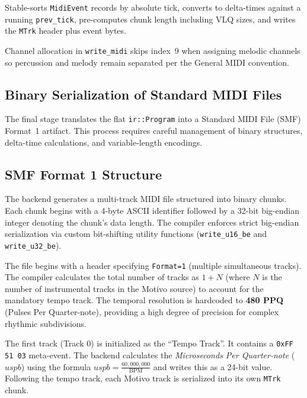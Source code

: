  Stable-sorts \texttt{MidiEvent} records by absolute tick, converts to
delta-times against a running \texttt{prev\_tick}, pre-computes chunk length including VLQ sizes, and writes the
\texttt{MTrk} header plus event bytes.

Channel allocation in \texttt{write\_midi} skips index~9 when assigning melodic channels so percussion and melody remain
separated per the General MIDI convention.

\subsection{Binary Serialization of Standard MIDI Files}\label{subsec:midi-binary-serialization}

The final stage translates the flat \texttt{ir::Program} into a Standard MIDI File (SMF) Format~1 artifact.
This process requires careful management of binary structures, delta-time calculations, and variable-length encodings.

\subsection{SMF Format 1 Structure}\label{detail-subsec:smf-format-1-structure}

The backend generates a multi-track MIDI file structured into binary chunks.
Each chunk begins with a 4-byte ASCII identifier followed by a 32-bit big-endian integer denoting the chunk's data
length.
The compiler enforces strict big-endian serialization via custom bit-shifting utility functions (\texttt{write\_u16\_be}
and \texttt{write\_u32\_be}).

 The file begins with a header specifying \texttt{Format=1}
(multiple simultaneous tracks).
The compiler calculates the total number of tracks as $1 + N$ (where $N$ is the number of instrumental tracks in the
Motivo source) to account for the mandatory tempo track.
The temporal resolution is hardcoded to \textbf{480 PPQ} (Pulses Per Quarter-note), providing a high degree of
precision for complex rhythmic subdivisions.

 The first track (Track 0) is initialized as the ``Tempo Track''.
It contains a \texttt{0xFF 51 03} meta-event.
The backend calculates the \textit{Microseconds Per Quarter-note} ($uspb$) using the formula $uspb =
\frac{60,000,000}{\mathrm{BPM}}$ and writes this as a 24-bit value.
Following the tempo track, each Motivo track is serialized into its own \texttt{MTrk} chunk.

